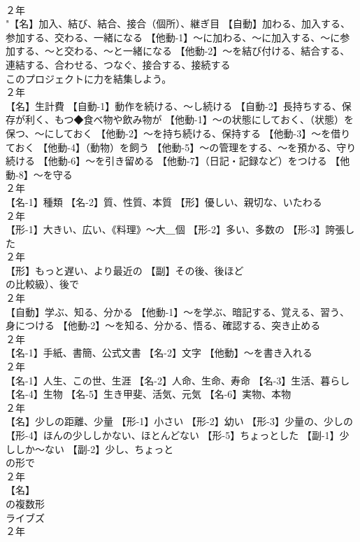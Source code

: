 \documentclass[8pt]{extreport}
\begin{document}
\begin{CJK}{UTF8}{min}
\\	２年	
\\	"【名】加入、結び、結合、接合（個所）、継ぎ目 【自動】加わる、加入する、参加する、交わる、一緒になる 【他動-1】～に加わる、～に加入する、～に参加する、～と交わる、～と一緒になる 【他動-2】～を結び付ける、結合する、連結する、合わせる、つなぐ、接合する、接続する 
\\	このプロジェクトに力を結集しよう。
\\	２年	
\\	【名】生計費 【自動-1】動作を続ける、～し続ける 【自動-2】長持ちする、保存が利く、もつ◆食べ物や飲み物が 【他動-1】～の状態にしておく、（状態）を保つ、～にしておく 【他動-2】～を持ち続ける、保持する 【他動-3】～を借りておく 【他動-4】（動物）を飼う 【他動-5】～の管理をする、～を預かる、守り続ける 【他動-6】～を引き留める 【他動-7】（日記・記録など）をつける 【他動-8】～を守る
\\	２年	
\\	【名-1】種類 【名-2】質、性質、本質 【形】優しい、親切な、いたわる
\\	２年	
\\	【形-1】大きい、広い、《料理》～大＿個 【形-2】多い、多数の 【形-3】誇張した
\\	２年	
\\	【形】もっと遅い、より最近の 【副】その後、後ほど
\\	の比較級）、後で
\\	２年	
\\	【自動】学ぶ、知る、分かる 【他動-1】～を学ぶ、暗記する、覚える、習う、身につける 【他動-2】～を知る、分かる、悟る、確認する、突き止める
\\	２年	
\\	【名-1】手紙、書簡、公式文書 【名-2】文字 【他動】～を書き入れる
\\	２年	
\\	【名-1】人生、この世、生涯 【名-2】人命、生命、寿命 【名-3】生活、暮らし 【名-4】生物 【名-5】生き甲斐、活気、元気 【名-6】実物、本物
\\	２年	
\\	【名】少しの距離、少量 【形-1】小さい 【形-2】幼い 【形-3】少量の、少しの 【形-4】ほんの少ししかない、ほとんどない 【形-5】ちょっとした 【副-1】少ししか～ない 【副-2】少し、ちょっと
\\	の形で
\\	２年	
\\	【名】
\\	の複数形 
\\	ライブズ
\\	２年	

\end{CJK}
\end{document}

